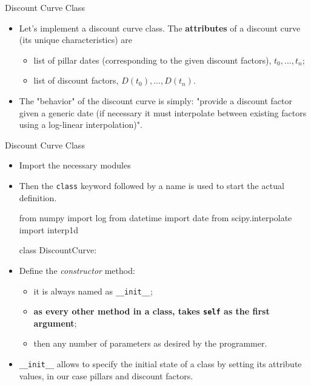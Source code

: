 \documentclass{beamer}
\begin{document}
\begin{frame}{Discount Curve Class}
  \begin{itemize}
  \item Let's implement a discount curve class. The \textbf{attributes} of a discount curve (its unique characteristics) are
      \begin{itemize}
      \item list of pillar dates (corresponding to the given discount factors), $t_0,...,t_{n}$;
      \item list of discount factors, $D(t_0),...,D(t_{n})$.
      \end{itemize}
  \item The "behavior" of the discount curve is simply: "provide a discount factor given a generic date (if necessary it must interpolate between existing factors using a log-linear interpolation)".
  \end{itemize}
\end{frame}
      
\begin{frame}[fragile]{Discount Curve Class}
\begin{itemize}
  \item Import the necessary modules
  
  \item Then the \texttt{class} keyword followed by a name is used to start the actual definition.
\begin{ipython}
from numpy import log
from datetime import date
from scipy.interpolate import interp1d  

class DiscountCurve:
\end{ipython}
  \item Define the \emph{constructor} method:
    \begin{itemize}
    \item it is always named as \texttt{\_\_init\_\_};
    \item \textbf{as every other method in a class, takes \texttt{self} as the first argument};
    \item then any number of parameters as desired by the programmer.
    \end{itemize}
  \item \texttt{\_\_init\_\_} allows to specify the initial state of a class by setting its attribute values, in our case pillars and discount factors.
  \end{itemize}
\end{frame}
\end{document}
